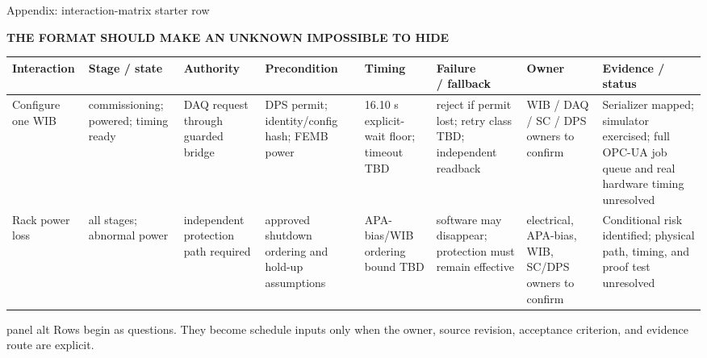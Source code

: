 \documentclass[aspectratio=169,10pt]{beamer}
\newcommand{\eyebrow}[1]{{\color{noircyan}\scriptsize\bfseries #1\par}}
\begin{document}
\begin{frame}[t]{Appendix: interaction-matrix starter row}
\eyebrow{THE FORMAT SHOULD MAKE AN UNKNOWN IMPOSSIBLE TO HIDE}
\vspace{1.3mm}

\scriptsize
\setlength{\tabcolsep}{3.5pt}
\begin{tabularx}{\linewidth}{@{}p{1.55cm}p{1.35cm}p{1.65cm}p{1.65cm}p{1.55cm}p{1.65cm}p{1.55cm}X@{}}
\toprule
\textbf{Interaction} &
\textbf{Stage / state} &
\textbf{Authority} &
\textbf{Precondition} &
\textbf{Timing} &
\shortstack[l]{\textbf{Failure}\\\textbf{/ fallback}} &
\textbf{Owner} &
\textbf{Evidence / status} \\
\midrule
Configure one WIB &
commis\-sioning; powered; timing ready &
DAQ request through guarded bridge &
DPS permit; identity/config hash; FEMB power &
16.10 s explicit-wait floor; timeout TBD &
reject if permit lost; retry class TBD; independent readback &
WIB / DAQ / SC / DPS owners to confirm &
Serializer mapped; simulator exercised; full OPC-UA job queue and real hardware timing unresolved \\
\addlinespace
Rack power loss &
all stages; abnormal power &
independent protection path required &
approved shutdown ordering and hold-up assumptions &
APA-bias/WIB ordering bound TBD &
software may disappear; protection must remain effective &
electrical, APA-bias, WIB, SC/DPS owners to confirm &
Conditional risk identified; physical path, timing, and proof test unresolved \\
\bottomrule
\end{tabularx}

\vspace{1mm}
\begin{beamercolorbox}[wd=\linewidth,sep=4pt,rounded=true]{panel alt}
\centering
Rows begin as questions. They become schedule inputs only when the owner,
source revision, acceptance criterion, and evidence route are explicit.
\end{beamercolorbox}
\end{frame}
\end{document}
